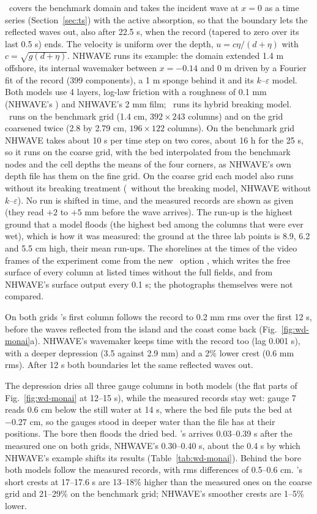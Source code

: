 \NHFOAM\ covers the benchmark domain and takes the incident wave at $x = 0$
as a time series (Section~\ref{sec:ts}) with the active absorption, so that
the boundary lets the reflected waves out, also after 22.5 s, when the
record (tapered to zero over its last 0.5 s) ends. The velocity is uniform
over the depth, $u = c\eta/(d+\eta)$ with $c = \sqrt{g(d+\eta)}$. NHWAVE runs
its example: the domain extended 1.4 m offshore, its internal wavemaker
between $x = -0.14$ and 0 m driven by a Fourier fit of the record (399
components), a 1 m sponge behind it and its $k$--$\varepsilon$ model. Both
models use 4 layers, log-law friction with a roughness of 0.1 mm (NHWAVE's
) and NHWAVE's 2 mm film; \NHFOAM\ runs its hybrid breaking model.
\NHFOAM\ runs on the benchmark grid (1.4 cm, $392\times243$ columns) and on
the grid coarsened twice (2.8 by 2.79 cm, $196\times122$ columns). On the
benchmark grid NHWAVE takes about 10 s per time step on two cores, about
16 h for the 25 s, so it runs on the coarse grid, with the bed interpolated from the
benchmark nodes and the cell depths the means of the four corners, as
NHWAVE's own depth file has them on the fine grid. On the coarse grid each
model also runs without its breaking treatment (\NHFOAM\ without the
breaking model, NHWAVE without $k$--$\varepsilon$). No run is shifted in
time, and the measured records are shown as given (they read $+2$ to $+5$
mm before the wave arrives). The run-up is the highest ground that a model
floods (the highest bed among the columns that were ever wet), which is how
it was measured: the ground at the three lab points is 8.9, 6.2 and 5.5 cm
high, their mean run-ups. The shorelines at the times of the video frames
of the experiment come from the new \NHFOAM\ option
, which writes the free surface of every column at
listed times without the full fields, and from NHWAVE's surface output every
0.1 s; the photographs themselves were not compared.

On both grids \NHFOAM's first column follows the record to 0.2 mm rms over
the first 12 s, before the waves reflected from the island and the coast
come back (Fig.~\ref{fig:wd-monai}a). NHWAVE's wavemaker keeps time with the
record too (lag 0.001 s), with a deeper depression (3.5 against 2.9 mm) and
a 2\% lower crest (0.6 mm rms). After 12 s both boundaries let the same
reflected waves out.

The depression dries all three gauge columns in both models (the flat parts
of Fig.~\ref{fig:wd-monai} at 12--15 s), while the measured records stay wet:
gauge 7 reads 0.6 cm below the still water at 14 s, where the bed file puts
the bed at $-0.27$ cm, so the gauges stood in deeper water than the file has
at their positions. The bore then floods the dried bed. \NHFOAM's arrives
0.03--0.39 s after the measured one on both grids, NHWAVE's 0.30--0.40 s,
about the 0.4 s by which NHWAVE's example shifts its results
(Table~\ref{tab:wd-monai}). Behind the bore both models follow the measured
records, with rms differences of 0.5--0.6 cm. \NHFOAM's short crests at
17--17.6 s are 13--18\% higher than the measured ones on the coarse grid and
21--29\% on the benchmark grid; NHWAVE's smoother crests are 1--5\% lower.

